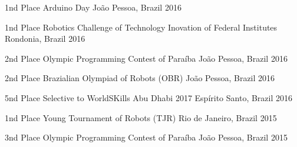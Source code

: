 \begin{cvhonors}
        
 \cvhonor
    {1nd Place} %
    {Arduino Day} %
    {João Pessoa, Brazil} %
    {2016} %

 \cvhonor
    {1nd Place} %
    {Robotics Challenge of Technology Inovation of Federal Institutes} %
    {Rondonia, Brazil} %
    {2016} %

 \cvhonor
    {2nd Place} %
    {Olympic Programming Contest of Paraíba} %
    {João Pessoa, Brazil} %
    {2016} %
    
 \cvhonor
    {2nd Place} %
    {Brazialian Olympiad of Robots (OBR)} %
    {João Pessoa, Brazil} %
    {2016} %
    
    
 \cvhonor
    {5nd Place} %
    {Selective to WorldSKills Abu Dhabi 2017} %
    {Espírito Santo, Brazil} %
    {2016} %
   
 \cvhonor
    {1nd Place} %
    {Young Tournament of Robots (TJR)} %
    {Rio de Janeiro, Brazil} %
    {2015} %
    
    
 \cvhonor
    {3nd Place} %
    {Olympic Programming Contest of Paraíba} %
    {João Pessoa, Brazil} %
    {2015} %
    

\end{cvhonors}
